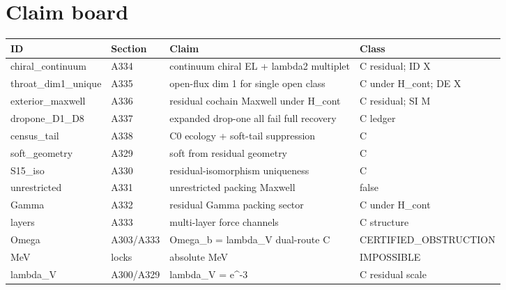 \documentclass[11pt,a4paper]{article}
\begin{document}
\section{Claim board}
\begin{center}
\begin{tabular}{@{}p{2.8cm}p{2cm}p{5.4cm}p{3cm}@{}}
\toprule ID & Section & Claim & Class \\
\midrule
chiral\_continuum & A334 & continuum chiral EL + lambda2 multiplet & C residual; ID X \\
throat\_dim1\_unique & A335 & open-flux dim 1 for single open class & C under H_cont; DE X \\
exterior\_maxwell & A336 & residual cochain Maxwell under H_cont & C residual; SI M \\
dropone\_D1\_D8 & A337 & expanded drop-one all fail full recovery & C ledger \\
census\_tail & A338 & C0 ecology + soft-tail suppression & C \\
soft\_geometry & A329 & soft from residual geometry & C \\
S15\_iso & A330 & residual-isomorphism uniqueness & C \\
unrestricted & A331 & unrestricted packing Maxwell & false \\
Gamma & A332 & residual Gamma packing sector & C under H_cont \\
layers & A333 & multi-layer force channels & C structure \\
Omega & A303/A333 & Omega_b = lambda_V dual-route C & CERTIFIED_OBSTRUCTION \\
MeV & locks & absolute MeV & IMPOSSIBLE \\
lambda\_V & A300/A329 & lambda_V = e^{-3} & C residual scale \\
\bottomrule
\end{tabular}
\end{center}
\end{document}
